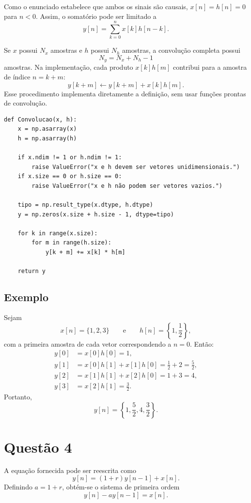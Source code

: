 \documentclass[12pt]{article}
\begin{document}
Como o enunciado estabelece que ambos os sinais são causais,
$x[n]=h[n]=0$ para $n<0$. Assim, o somatório pode ser limitado a
\[
y[n]=\sum_{k=0}^{n}x[k]h[n-k].
\]

Se $x$ possui $N_x$ amostras e $h$ possui $N_h$ amostras, a convolução completa
possui
\[
N_y=N_x+N_h-1
\]
amostras. Na implementação, cada produto $x[k]h[m]$ contribui para a amostra
de índice $n=k+m$:
\[
y[k+m]\leftarrow y[k+m]+x[k]h[m].
\]
Esse procedimento implementa diretamente a definição, sem usar funções prontas
de convolução.

\begin{verbatim}
def Convolucao(x, h):
    x = np.asarray(x)
    h = np.asarray(h)

    if x.ndim != 1 or h.ndim != 1:
        raise ValueError("x e h devem ser vetores unidimensionais.")
    if x.size == 0 or h.size == 0:
        raise ValueError("x e h não podem ser vetores vazios.")

    tipo = np.result_type(x.dtype, h.dtype)
    y = np.zeros(x.size + h.size - 1, dtype=tipo)

    for k in range(x.size):
        for m in range(h.size):
            y[k + m] += x[k] * h[m]

    return y
\end{verbatim}

\subsection*{Exemplo}

Sejam
\[
x[n]=\{1,2,3\}
\qquad\text{e}\qquad
h[n]=\left\{1,\frac{1}{2}\right\},
\]
com a primeira amostra de cada vetor correspondendo a $n=0$. Então:
\[
\begin{aligned}
y[0]&=x[0]h[0]=1,\\
y[1]&=x[0]h[1]+x[1]h[0]=\frac{1}{2}+2=\frac{5}{2},\\
y[2]&=x[1]h[1]+x[2]h[0]=1+3=4,\\
y[3]&=x[2]h[1]=\frac{3}{2}.
\end{aligned}
\]
Portanto,
\[
\boxed{y[n]=\left\{1,\frac{5}{2},4,\frac{3}{2}\right\}}.
\]

\clearpage
\section*{Questão 4}

A equação fornecida pode ser reescrita como
\[
y[n]=(1+r)y[n-1]+x[n].
\]
Definindo $a=1+r$, obtém-se o sistema de primeira ordem
\[
y[n]-ay[n-1]=x[n].
\]
\end{document}
